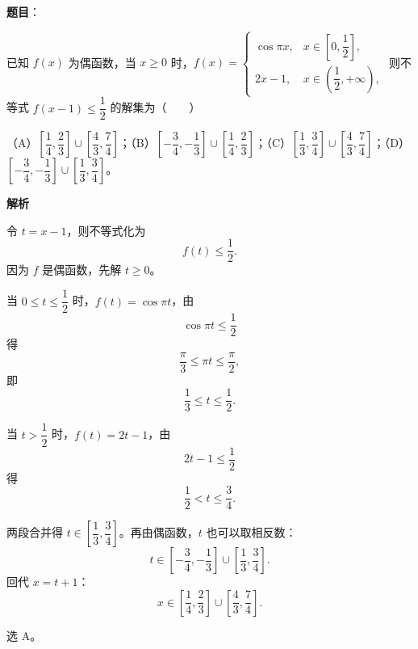 \begin{answer}

\textbf{题目}：

已知 $f(x)$ 为偶函数，当 $x\geqslant 0$ 时，$f(x)=\begin{cases}\cos\pi x,&x\in\left[0,\dfrac12\right],\\2x-1,&x\in\left(\dfrac12,+\infty\right),\end{cases}$ 则不等式 $f(x-1)\leqslant\dfrac12$ 的解集为\mbox{（　　）}

（A）$\left[\dfrac14,\dfrac23\right]\cup\left[\dfrac43,\dfrac74\right]$；（B）$\left[-\dfrac34,-\dfrac13\right]\cup\left[\dfrac14,\dfrac23\right]$；（C）$\left[\dfrac13,\dfrac34\right]\cup\left[\dfrac43,\dfrac74\right]$；（D）$\left[-\dfrac34,-\dfrac13\right]\cup\left[\dfrac13,\dfrac34\right]$。

\textbf{解析}

令 $t=x-1$，则不等式化为
\nopagebreak[4]
\[f(t)\leqslant\frac12.\]
因为 $f$ 是偶函数，先解 $t\geqslant0$。

当 $0\leqslant t\leqslant\dfrac12$ 时，$f(t)=\cos\pi t$，由
\nopagebreak[4]
\[\cos\pi t\leqslant\frac12\]
得
\nopagebreak[4]
\[\frac\pi3\leqslant\pi t\leqslant\frac\pi2,\]
即
\nopagebreak[4]
\[\frac13\leqslant t\leqslant\frac12.\]

当 $t>\dfrac12$ 时，$f(t)=2t-1$，由
\nopagebreak[4]
\[2t-1\leqslant\frac12\]
得
\nopagebreak[4]
\[\frac12<t\leqslant\frac34.\]

两段合并得 $t\in\left[\dfrac13,\dfrac34\right]$。再由偶函数，$t$ 也可以取相反数：
\nopagebreak[4]
\[t\in\left[-\frac34,-\frac13\right]\cup\left[\frac13,\frac34\right].\]
回代 $x=t+1$：
\nopagebreak[4]
\[x\in\left[\frac14,\frac23\right]\cup\left[\frac43,\frac74\right].\]

选 A。


\end{answer}
